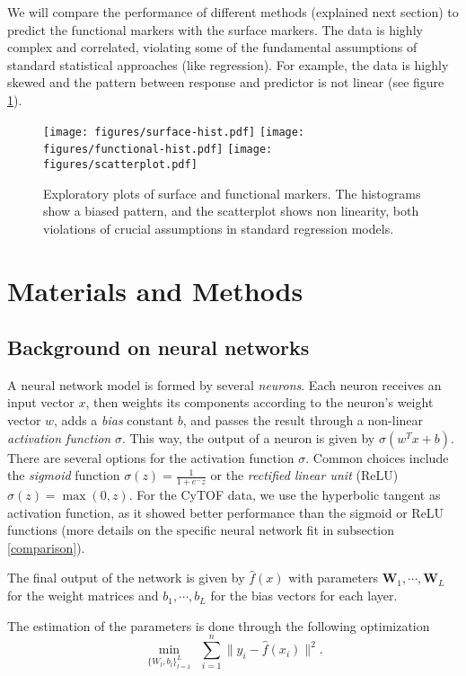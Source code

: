 \documentclass[graybox]{svmult}
\begin{document}
We will compare the performance of different methods (explained next
section) to predict the functional markers with the surface markers.
The data is highly complex and correlated, violating some of the
fundamental assumptions of standard statistical approaches (like
regression). For example, the data is highly skewed and the pattern
between response and predictor is not linear (see figure
\ref{exploratory}). 

\begin{figure}
\texttt{[image: figures/surface-hist.pdf]}
\texttt{[image: figures/functional-hist.pdf]}
\texttt{[image: figures/scatterplot.pdf]}
\caption{Exploratory plots of surface and functional markers. The
  histograms show a biased pattern, and the scatterplot shows non
  linearity, both violations of crucial assumptions in standard
  regression models.}
\label{exploratory}
\end{figure}


\section{Materials and Methods}

\subsection{Background on neural networks}

A neural network model is formed by several {\em neurons}. Each neuron
receives an input vector $x$, then weights its components according to
the neuron's weight vector $w$, adds a {\em bias} constant $b$, and
passes the result through a non-linear {\em activation function}
$\sigma$. This way, the output of a neuron is given by $\sigma(w^Tx +
b)$. There are several options for the activation function
$\sigma$. Common choices include the {\em sigmoid} function
$\sigma(z)=\frac{1}{1+e^-z}$ or the {\em rectified linear unit} (ReLU)
$\sigma(z)=\max(0,z)$. For the CyTOF data, we use the hyperbolic
tangent as activation function, as it showed better performance than
the sigmoid or ReLU functions (more details on the specific neural
network fit in subsection \ref{comparison}).

The final output of the network is given by $\hat{f}(x)$ with
parameters $\mathbf{W}_1,\cdots,\mathbf{W}_L$ for the weight matrices
and $b_1,\cdots,b_L$ for the bias vectors for each layer.

The estimation of the parameters is done through the following
optimization
\begin{equation}
\min_{\{W_l,b_l\}_{l=1}^L} \ \ \sum_{i=1}^n \| y_i-\hat{f}(x_i) \|^2.
\end{equation}
\end{document}
